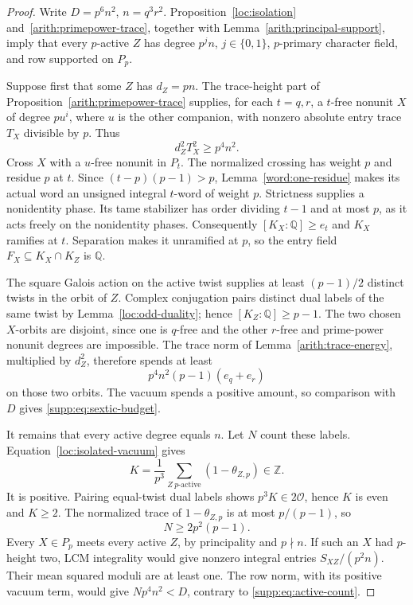 \documentclass[11pt,a4paper]{article}
\numberwithin{equation}{section}
\begin{document}
\begin{proof}
Write $D=p^6n^2$, $n=q^3r^2$. Proposition~\ref{loc:isolation}
and~\ref{arith:primepower-trace}, together with
Lemma~\ref{arith:principal-support}, imply that every
$p$-active $Z$ has degree $p^jn$, $j\in\{0,1\}$,
$p$-primary character field, and row supported on $P_p$.

Suppose first that some $Z$ has $d_Z=pn$. The trace-height
part of Proposition~\ref{arith:primepower-trace} supplies, for
each $t=q,r$, a $t$-free nonunit $X$ of degree $pu^i$,
where $u$ is the other companion, with nonzero absolute
entry trace $T_X$ divisible by $p$. Thus
\[
                         d_Z^2 T_X^2\ge p^4n^2.
\]
Cross $X$ with a $u$-free nonunit in $P_t$. The normalized
crossing has weight $p$ and residue $p$ at $t$.
Since $(t-p)(p-1)>p$, Lemma~\ref{word:one-residue}
makes its actual word an unsigned integral $t$-word
of weight $p$. Strictness supplies a nonidentity phase.
Its tame stabilizer has order dividing $t-1$ and at
most $p$, as it acts freely on the nonidentity phases.
Consequently $[K_X:\mathbb Q]\ge e_t$ and $K_X$
ramifies at $t$. Separation makes it unramified at $p$,
so the entry field $F_X\subseteq K_X\cap K_Z$ is
$\mathbb Q$.

The square Galois action on the active twist supplies
at least $(p-1)/2$ distinct twists in the orbit of $Z$.
Complex conjugation pairs distinct dual labels of the
same twist by Lemma~\ref{loc:odd-duality}; hence
$[K_Z:\mathbb Q]\ge p-1$. The two chosen $X$-orbits
are disjoint, since one is $q$-free and the other
$r$-free and prime-power nonunit degrees are impossible.
The trace norm of Lemma~\ref{arith:trace-energy},
multiplied by $d_Z^2$, therefore spends at least
\[
                      p^4n^2(p-1)(e_q+e_r)
\]
on those two orbits. The vacuum spends a positive amount,
so comparison with $D$ gives \eqref{supp:eq:sextic-budget}.

It remains that every active degree equals $n$. Let $N$
count these labels. Equation~\eqref{loc:isolated-vacuum} gives
\[
 K=\frac1{p^3}\sum_{Z\ p\text{-active}}(1-\theta_{Z,p})
                  \in\mathbb Z.
\]
It is positive. Pairing equal-twist dual labels shows
$p^3K\in2\mathcal O$, hence $K$ is even and $K\ge2$.
The normalized trace of $1-\theta_{Z,p}$ is at most
$p/(p-1)$, so
\begin{equation}\label{supp:eq:active-count}
                         N\ge2p^2(p-1).
\end{equation}
Every $X\in P_p$ meets every active $Z$, by principality
and $p\nmid n$. If such an $X$ had $p$-height two,
LCM integrality would give nonzero integral entries
$S_{XZ}/(p^2n)$. Their mean squared moduli are at least
one. The row norm, with its positive vacuum term, would
give $Np^4n^2<D$, contrary to \eqref{supp:eq:active-count}.


\end{proof}
\end{document}
